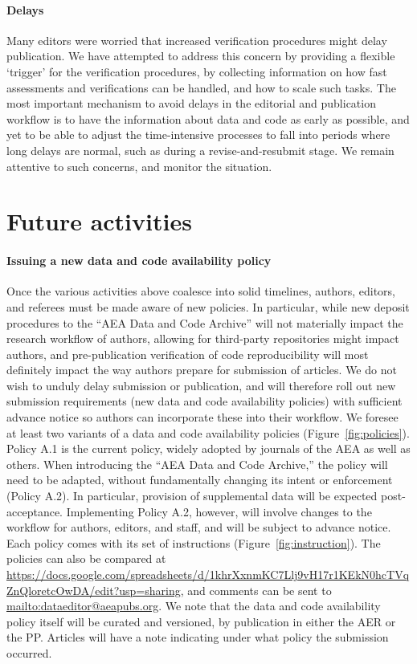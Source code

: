 \documentclass[AEJ]{AEA}
\begin{document}
\paragraph{Delays} Many editors were worried that increased verification procedures might delay publication. We have attempted to address this concern by providing a flexible `trigger' for the verification procedures, by collecting information on how fast assessments and verifications can be handled, and how to scale such tasks. The most important mechanism to avoid delays in the editorial and publication workflow is to have the information about data and code as early as possible, and yet to be able to adjust the time-intensive processes to fall into periods where long delays are normal, such as during a revise-and-resubmit stage. We remain attentive to such concerns, and monitor the situation.




\section{Future activities}

\paragraph{Issuing a new data and code availability policy} Once the various activities above coalesce into solid timelines, authors, editors, and referees must be made aware of new policies. In particular, while new deposit procedures to the ``AEA Data and Code Archive'' will not materially impact the research workflow of authors, allowing for third-party repositories might impact authors, and pre-publication verification of code reproducibility will most definitely impact the way authors prepare for submission of articles. We do not wish to unduly delay submission or publication, and will therefore roll out new submission requirements (new data and code availability policies) with sufficient advance notice so authors can incorporate these into their workflow. We foresee at least two variants of a data and code availability policies (Figure~\ref{fig:policies}). Policy A.1 is the current policy, widely adopted by journals of the AEA as well as others. When introducing the ``AEA Data and Code Archive,'' the policy will need to be adapted, without fundamentally changing its intent or enforcement (Policy A.2). In particular, provision of supplemental data will be expected post-acceptance. Implementing Policy A.2, however, will involve changes to the workflow for authors, editors, and staff, and will be subject to advance notice. Each policy comes with its set of instructions  (Figure~\ref{fig:instruction}). The policies can also be compared at \url{https://docs.google.com/spreadsheets/d/1khrXxnmKC7Llj9vH17r1KEkN0hcTVqZnQloretcOwDA/edit?usp=sharing}, and comments can be sent to \url{mailto:dataeditor@aeapubs.org}. We note that the data and code availability policy itself will be curated and versioned, by publication in either the AER or the PP. Articles will have a note indicating under what policy the submission occurred. 
\end{document}
